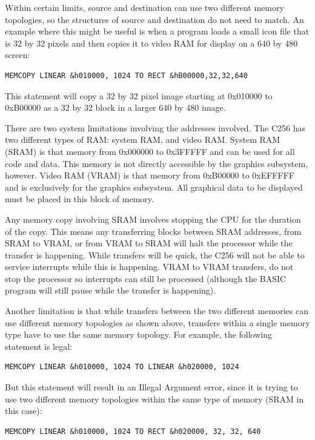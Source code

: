 \documentclass{report}
\begin{document}
    Within certain limits, source and destination can use two different memory topologies,
    so the structures of source and destination do not need to match.
    An example where this
    might be useful is when a program loads a small icon file that is 32 by 32 pixels and
    then copies it to video RAM for display on a 640 by 480 screen:

    \begin{verbatim}
MEMCOPY LINEAR &h010000, 1024 TO RECT &hB00000,32,32,640
    \end{verbatim}

    This statement will copy a 32 by 32 pixel image starting at 0x010000 to
    0xB00000 as a 32 by 32 block in a larger 640 by 480 image.

    There are two system limitations involving the addresses involved.
    The C256 has two different types of RAM: system RAM, and video RAM.
    System RAM (SRAM) is that memory from 0x000000 to 0x3FFFFF and can be used for all
    code and data. This memory is not directly accessible by the graphics subsystem,
    however.
    Video RAM (VRAM) is that memory from 0xB00000 to 0xEFFFFF and is exclusively for the
    graphics subsystem. All graphical data to be displayed must be placed in this block
    of memory.

    Any memory copy involving SRAM involves stopping the CPU for the duration of the copy.
    This means any  transferring blocks between SRAM addresses, from SRAM
    to VRAM, or from VRAM to SRAM will halt the processor while the transfer is happening.
    While transfers will be quick, the C256 will not be able to service interrupts while
    this is happening. VRAM to VRAM transfers, do not stop the processor so interrupts
    can still be processed (although the BASIC program will still pause while the transfer
    is happening).

    Another limitation is that while transfers between the two different memories can
    use different memory topologies as shown above, transfers within a single memory type
    have to use the same memory topology. For example, the following statement is
    legal:

    \begin{verbatim}
MEMCOPY LINEAR &h010000, 1024 TO LINEAR &h020000, 1024
    \end{verbatim}

    But this statement will result in an Illegal Argument error, since it is trying to use
    two different memory topologies within the same type of memory (SRAM in this case):
    \begin{verbatim}
MEMCOPY LINEAR &h010000, 1024 TO RECT &h020000, 32, 32, 640
    \end{verbatim}
\end{document}
